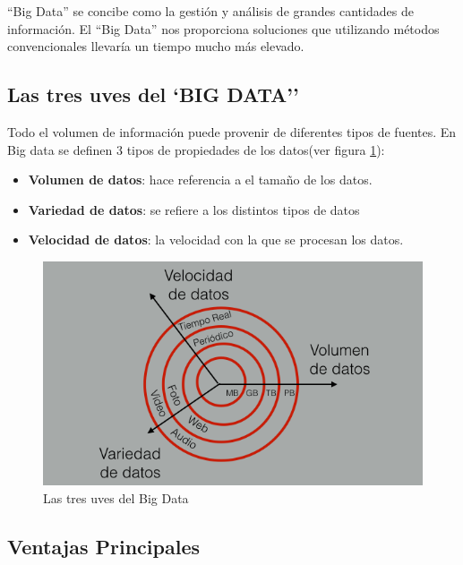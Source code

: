 ``Big Data'' se concibe como la gestión y análisis de grandes cantidades de información. El ``Big Data'' nos proporciona soluciones que utilizando métodos convencionales llevaría un tiempo mucho más elevado.

\subsection{Las tres uves del `BIG DATA''}

Todo el volumen de información puede provenir de diferentes tipos de fuentes. En Big data se definen 3 tipos de propiedades de los datos(ver figura \ref{3vs}):

\begin{itemize}

\item \textbf{Volumen de datos}: hace referencia a el tamaño de los datos.

\item \textbf{Variedad de datos}: se refiere a los distintos tipos de datos

\item \textbf{Velocidad de datos}: la velocidad con la que se procesan los datos.

\end{itemize}

\begin{figure}
\begin{center}
\includegraphics[width=1.0\textwidth]{imagenes/3V.png}
\caption{Las tres uves del Big Data}
\label{3vs}
\end{center}
\end{figure}

\subsection{Ventajas Principales}


